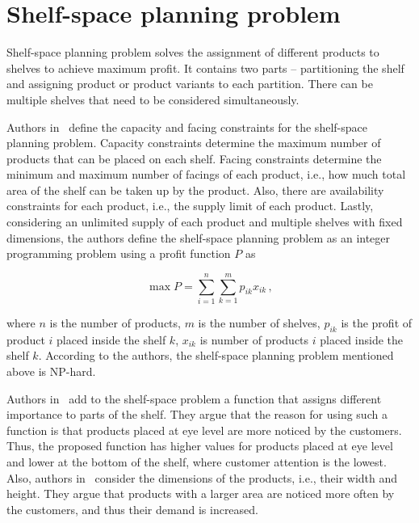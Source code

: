 \newpage
\section{Shelf-space planning problem}\label{sec:shelf-space-planning}

Shelf-space planning problem solves the assignment of different products to shelves to achieve maximum profit.
It contains two parts – partitioning the shelf and assigning product or product variants to each partition.
There can be multiple shelves that need to be considered simultaneously.~\cite{bianchi-aguiarRetailShelfSpace2021}

Authors in~\cite{yangStudyShelfSpace1999} define the capacity and facing constraints for the shelf-space planning problem.
Capacity constraints determine the maximum number of products that can be placed on each shelf.
Facing constraints determine the minimum and maximum number of facings of each product, i.e., how much total area of the shelf can be taken up by the product.
Also, there are availability constraints for each product, i.e., the supply limit of each product.
Lastly, considering an unlimited supply of each product and multiple shelves with fixed dimensions,
the authors define the shelf-space planning problem as an integer programming problem using a profit function $P$ as

\begin{equation}
    \max P = \sum\limits_{i=1}^n\sum\limits_{k=1}^mp_{ik} x_{ik}\,,
    \label{eq:shelf-space-planning}
\end{equation}

where $n$ is the number of products, $m$ is the number of shelves, $p_{ik}$ is the profit of product $i$ placed inside the shelf $k$, $x_{ik}$
is number of products $i$ placed inside the shelf $k$.
According to the authors, the shelf-space planning problem mentioned above is NP-hard.

Authors in~\cite{hwangGeneticAlgorithmApproach2009} add to the shelf-space problem a function that assigns
different importance to parts of the shelf.
They argue that the reason for using such a function is that products placed at eye level are more noticed by the customers.
Thus, the proposed function has higher values for products placed at eye level and lower at the bottom of the shelf,
where customer attention is the lowest.
Also, authors in~\cite{hubnerMaximizingProfitAssortment2020} consider the dimensions of the products, i.e., their width and height.
They argue that products with a larger area are noticed more often by the customers, and thus their demand is increased.

